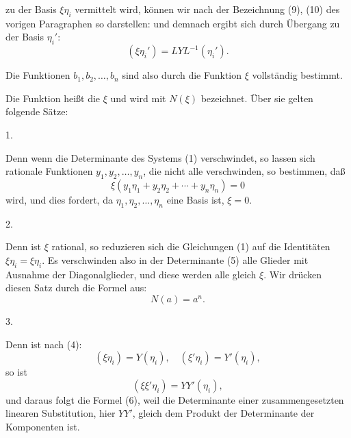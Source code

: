 zu der Basis $\xi\eta_i$ vermittelt wird, können wir nach der Bezeichnung (9), (10) des vorigen Paragraphen so darstellen:
und demnach ergibt sich durch Übergang zu der Basis $\eta_i'$:
\[
(\xi\eta_i') = LYL^{-1}(\eta_i').
\]

Die Funktionen $b_1, b_2, \ldots, b_n$ sind also durch die Funktion $\xi$ vollständig bestimmt.

Die Funktion
heißt die  $\xi$ und wird mit $N(\xi)$ bezeichnet. Über sie gelten folgende Sätze:

1. 

Denn wenn die Determinante des Systems (1) verschwindet, so lassen sich rationale Funktionen $y_1, y_2, \ldots, y_n$, die nicht alle verschwinden, so bestimmen, daß
\[
\xi(y_1\eta_1 + y_2\eta_2 + \cdots + y_n\eta_n) = 0
\]
wird, und dies fordert, da $\eta_1, \eta_2, \ldots, \eta_n$ eine Basis ist, $\xi = 0$.

2. 

Denn ist $\xi$ rational, so reduzieren sich die Gleichungen (1) auf die Identitäten $\xi\eta_i = \xi\eta_i$. Es verschwinden also in der Determinante (5) alle Glieder mit Ausnahme der Diagonalglieder, und diese werden alle gleich $\xi$. Wir drücken diesen Satz durch die Formel aus:
\[
N(a) = a^n.
\]

3. 

Denn ist nach (4):
\[
(\xi\eta_i) = Y(\eta_i), \quad (\xi'\eta_i) = Y'(\eta_i),
\]
so ist
\[
(\xi\xi'\eta_i) = YY'(\eta_i),
\]
und daraus folgt die Formel (6), weil die Determinante einer zusammengesetzten linearen Substitution, hier $YY'$, gleich dem Produkt der Determinante der Komponenten ist.
